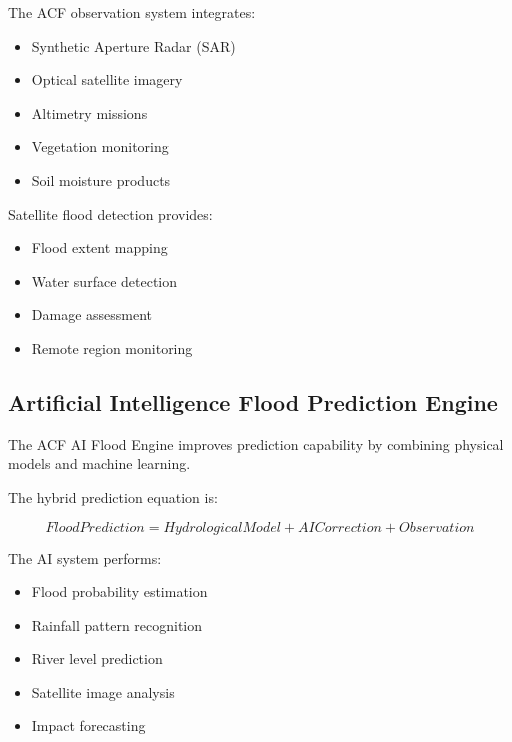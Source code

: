 The ACF observation system integrates:

\begin{itemize}

\item Synthetic Aperture Radar (SAR)

\item Optical satellite imagery

\item Altimetry missions

\item Vegetation monitoring

\item Soil moisture products

\end{itemize}


Satellite flood detection provides:

\begin{itemize}

\item Flood extent mapping

\item Water surface detection

\item Damage assessment

\item Remote region monitoring

\end{itemize}



\subsection{Artificial Intelligence Flood Prediction Engine}

The ACF AI Flood Engine improves prediction capability by combining
physical models and machine learning.

The hybrid prediction equation is:

\[
FloodPrediction=
HydrologicalModel
+
AI Correction
+
Observation
\]


The AI system performs:

\begin{itemize}

\item Flood probability estimation

\item Rainfall pattern recognition

\item River level prediction

\item Satellite image analysis

\item Impact forecasting

\end{itemize}


